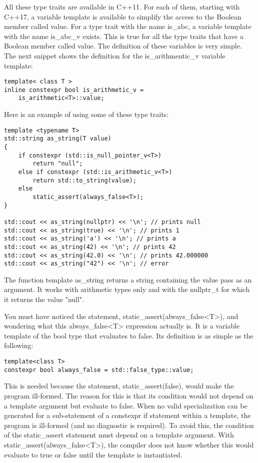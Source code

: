 All these type traits are available in C++11. For each of them, starting with C++17, a variable template is available to simplify the access to the Boolean member called value. For a type trait with the name is\_abc, a variable template with the name is\_abc\_v exists. This is true for all the type traits that have a Boolean member called value. The definition of these variables is very simple. The next snippet shows the definition for the is\_arithmentic\_v variable template:

\begin{lstlisting}[style=styleCXX]
template< class T >
inline constexpr bool is_arithmetic_v =
	is_arithmetic<T>::value;
\end{lstlisting}

Here is an example of using some of these type traits:

\begin{lstlisting}[style=styleCXX]
template <typename T>
std::string as_string(T value)
{
	if constexpr (std::is_null_pointer_v<T>)
		return "null";
	else if constexpr (std::is_arithmetic_v<T>)
		return std::to_string(value);
	else
		static_assert(always_false<T>);
}

std::cout << as_string(nullptr) << '\n'; // prints null
std::cout << as_string(true) << '\n'; // prints 1
std::cout << as_string('a') << '\n'; // prints a
std::cout << as_string(42) << '\n'; // prints 42
std::cout << as_string(42.0) << '\n'; // prints 42.000000
std::cout << as_string("42") << '\n'; // error
\end{lstlisting}

The function template as\_string returns a string containing the value pass as an argument. It works with arithmetic types only and with the nullptr\_t for which it returns the value "null".

You must have noticed the statement, static\_assert(always\_false<T>), and wondering what this always\_false<T> expression actually is. It is a variable template of the bool type that evaluates to false. Its definition is as simple as the following:

\begin{lstlisting}[style=styleCXX]
template<class T>
constexpr bool always_false = std::false_type::value;
\end{lstlisting}

This is needed because the statement, static\_assert(false), would make the program ill-formed. The reason for this is that its condition would not depend on a template argument but evaluate to false. When no valid specialization can be generated for a sub-statement of a constexpr if statement within a template, the program is ill-formed (and no diagnostic is required). To avoid this, the condition of the static\_assert statement must depend on a template argument. With static\_assert(always\_false<T>), the compiler does not know whether this would evaluate to true or false until the template is instantiated.

